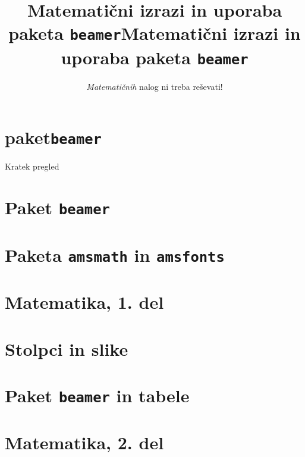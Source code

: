 \documentclass{beamer}
\begin{document}
\title{ Matematični izrazi in uporaba paketa \texttt{beamer}}
\section{paket\texttt{beamer}}



\title{Matematični izrazi in uporaba paketa \texttt{beamer}}
\subtitle{\emph{Matematičnih} nalog ni treba reševati!}
\date{} 
\titlepage

\begin{frame}{Kratek pregled}
    \tableofcontents[pausesections]
\end{frame}


\section{Paket \texttt{beamer}}




\section{Paketa \texttt{amsmath} in \texttt{amsfonts}}



\section[Matematika, 1. del\\\large{Analiza, logika, množice}]{Matematika, 1. del}

\section{Stolpci in slike}

\section{Paket \texttt{beamer} in tabele}

\section[Matematika, 2. del\\\large{Zaporedja, algebra, grupe}]{Matematika, 2. del}
\end{document}
